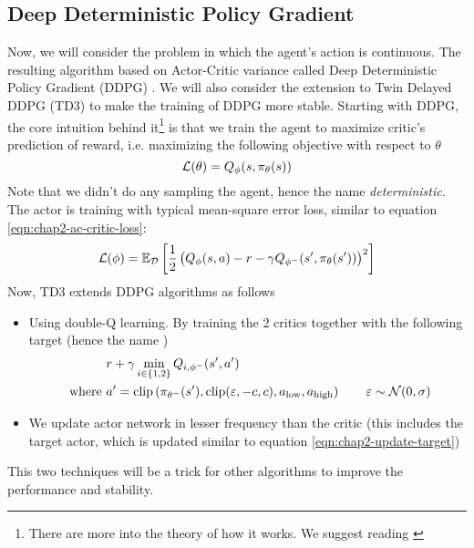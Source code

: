 \subsection{Deep Deterministic Policy Gradient}
\label{sec:chap2-ddpg}
Now, we will consider the problem in which the agent's action is continuous. The resulting algorithm based on Actor-Critic variance called Deep Deterministic Policy Gradient (DDPG) \cite{lillicrap2015continuous}. We will also consider the extension to Twin Delayed DDPG (TD3) \cite{fujimoto2018addressing} to make the training of DDPG more stable. Starting with DDPG, the core intuition behind it\footnote{There are more into the theory of how it works. We suggest reading \cite{silver2014deterministic}} is that we train the agent to maximize critic's prediction of reward, i.e. maximizing the following objective with respect to $\theta$
\begin{equation}
    \mathcal{L}(\theta) = Q_\phi(s, \pi_\theta(s))
\end{equation}
Note that we didn't do any sampling the agent, hence the name \textit{deterministic}.  The actor is training with typical mean-square error loss, similar to equation \ref{eqn:chap2-ac-critic-loss}:
\begin{equation}
    \mathcal{L}(\phi) = \mathbb{E}_{\mathcal{D}}\left[ \frac{1}{2}\left( Q_\phi(s, a) - r - \gamma Q_{\phi^-}(s', \pi_\theta(s')) \right)^2 \right]
\end{equation}
Now, TD3 extends DDPG algorithms as follows
\begin{itemize}
    \item Using double-Q learning. By training the 2 critics together with the following target (hence the name )
    \begin{equation}
    \begin{aligned}
        &r + \gamma \min_{i \in \left\{ 1, 2 \right\}} Q_{i, \phi^-}(s', a') \\
        \text{ where }& a' = \text{clip}\left( \pi_{\theta^-}(s'), \text{clip}(\varepsilon, -c, c), a_\text{low}, a_\text{high} \right) \qquad \varepsilon \sim \mathcal{N}(0, \sigma)
    \end{aligned}
    \end{equation}
    \item We update actor network in lesser frequency than the critic (this includes the target actor, which is updated similar to equation \ref{eqn:chap2-update-target})
\end{itemize}
This two techniques will be a trick for other algorithms to improve the performance and stability.